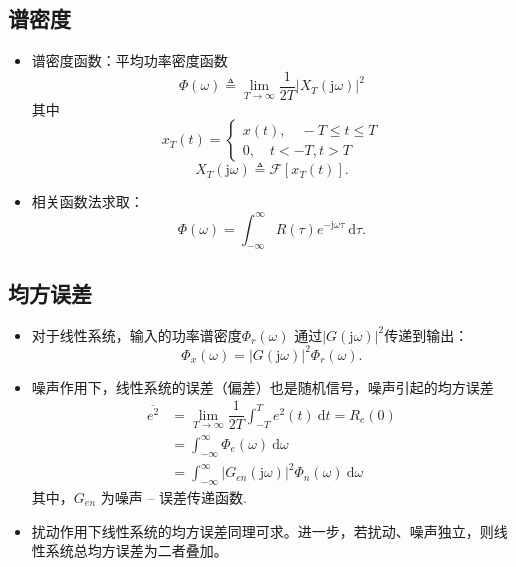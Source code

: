 \documentclass[14pt,a4paper]{article}
\theoremstyle{plain}
\theoremstyle{definition}
\theoremstyle{remark}
\theoremstyle{plain}
\theoremstyle{plain}
\theoremstyle{definition}
\begin{document}
		\subsection{谱密度}%
		\label{sub:谱密度}
		
			\begin{itemize}
				\item 谱密度函数：平均功率密度函数
					\[
						\varPhi(\omega ) \triangleq \lim_{T \to \infty} \dfrac{1}{2T} \left| X_T (\mathrm{j} \omega ) \right|^2
					\]
					其中
					\[
						x_T (t) = \begin{cases}
							x(t), \quad -T\le t\le T\\
							0, \quad t<-T, t>T
						\end{cases} 
					\] 
					\[
						X_T(\mathrm{j} \omega ) \triangleq \mathscr F \left[ x_T(t) \right] 
					.\]
				\item 相关函数法求取：
					\[
						\varPhi(\omega ) = \int_{-\infty}^\infty R(\tau) e^{-\mathrm{j} \omega\tau}	\ \mathrm d\tau
					.\] 
			\end{itemize}  
	
		\subsection{均方误差}%
		\label{sub:均方误差}
		
			\begin{itemize}
				\item 对于线性系统，输入的功率谱密度$\varPhi_r(\omega )$ 通过$\left| G(\mathrm{j} \omega ) \right|^2$传递到输出：
					\[
						\varPhi_x(\omega ) = \left| G(\mathrm{j} \omega ) \right|^2 \varPhi_r(\omega )
					.\] 
				\item 噪声作用下，线性系统的误差（偏差）也是随机信号，噪声引起的均方误差
					\[
					\begin{split}
						\overline{e^2} &= \lim_{T \to \infty} \dfrac{1}{2T} \int_{-T}^T e^2(t)\ \mathrm dt = R_e(0) \\
									   &= \int_{-\infty}^\infty \varPhi_e(\omega ) \ \mathrm d\omega \\
									   &= \int_{-\infty}^\infty \left| G_{en}(\mathrm{j} \omega ) \right|^2 \varPhi_{n}(\omega ) \ \mathrm d\omega 
					\end{split}
					\]
					其中，$G_{en}$ 为噪声 -- 误差传递函数. 
				\item 扰动作用下线性系统的均方误差同理可求。进一步，若扰动、噪声独立，则线性系统总均方误差为二者叠加。
			\end{itemize}  
\end{document}
